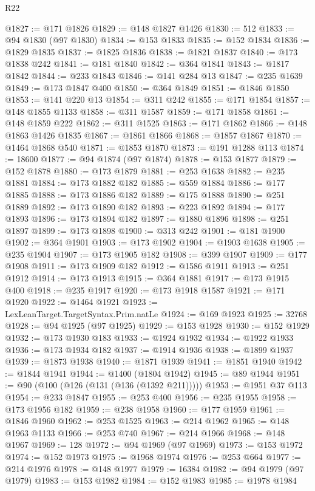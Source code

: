 \begin{lexlean}{R22}
\begin{coremodule}
@1827 := @171 @1826
@1829 := @148 @1827 @1426
@1830 := 512
@1833 := @94 @1830 (@97 @1830)
@1834 := @153 @1833
@1835 := @152 @1834
@1836 := @1829 @1835
@1837 := @1825 @1836
@1838 := @1821 @1837
@1840 := @173 @1838 @242
@1841 := @181 @1840
@1842 := @364 @1841
@1843 := @1817 @1842
@1844 := @233 @1843
@1846 := @141 @284 @13
@1847 := @235 @1639
@1849 := @173 @1847 @400
@1850 := @364 @1849
@1851 := @1846 @1850
@1853 := @141 @220 @13
@1854 := @311 @242
@1855 := @171 @1854
@1857 := @148 @1855 @1133
@1858 := @311 @1587
@1859 := @171 @1858
@1861 := @148 @1859 @222
@1862 := @311 @1525
@1863 := @171 @1862
@1866 := @148 @1863 @1426 @1835
@1867 := @1861 @1866
@1868 := @1857 @1867
@1870 := @1464 @1868 @540
@1871 := @1853 @1870
@1873 := @191 @1288 @113
@1874 := 18600
@1877 := @94 @1874 (@97 @1874)
@1878 := @153 @1877
@1879 := @152 @1878
@1880 := @173 @1879
@1881 := @253 @1638
@1882 := @235 @1881
@1884 := @173 @1882 @182
@1885 := @559 @1884
@1886 := @177 @1885
@1888 := @173 @1886 @182
@1889 := @175 @1888
@1890 := @251 @1889
@1892 := @173 @1890 @182
@1893 := @223 @1892
@1894 := @177 @1893
@1896 := @173 @1894 @182
@1897 := @1880 @1896
@1898 := @251 @1897
@1899 := @173 @1898
@1900 := @313 @242
@1901 := @181 @1900
@1902 := @364 @1901
@1903 := @173 @1902
@1904 := @1903 @1638
@1905 := @235 @1904
@1907 := @173 @1905 @182
@1908 := @399 @1907
@1909 := @177 @1908
@1911 := @173 @1909 @182
@1912 := @1586 @1911
@1913 := @251 @1912
@1914 := @173 @1913
@1915 := @364 @1881
@1917 := @173 @1915 @400
@1918 := @235 @1917
@1920 := @173 @1918 @1587
@1921 := @171 @1920
@1922 := @1464 @1921
@1923 := LexLeanTarget.TargetSyntax.Prim.natLe
@1924 := @169 @1923
@1925 := 32768
@1928 := @94 @1925 (@97 @1925)
@1929 := @153 @1928
@1930 := @152 @1929
@1932 := @173 @1930 @183
@1933 := @1924 @1932
@1934 := @1922 @1933
@1936 := @173 @1934 @182
@1937 := @1914 @1936
@1938 := @1899 @1937
@1939 := @1873 @1938
@1940 := @1871 @1939
@1941 := @1851 @1940
@1942 := @1844 @1941
@1944 := @1400 (@1804 @1942)
@1945 := @89 @1944
@1951 := @90 (@100 (@126 (@131 (@136 (@1392 @211)))))
@1953 := @1951 @37 @113
@1954 := @233 @1847
@1955 := @253 @400
@1956 := @235 @1955
@1958 := @173 @1956 @182
@1959 := @238 @1958
@1960 := @177 @1959
@1961 := @1846 @1960
@1962 := @253 @1525
@1963 := @214 @1962
@1965 := @148 @1963 @1133
@1966 := @253 @740
@1967 := @214 @1966
@1968 := @148 @1967
@1969 := 128
@1972 := @94 @1969 (@97 @1969)
@1973 := @153 @1972
@1974 := @152 @1973
@1975 := @1968 @1974
@1976 := @253 @664
@1977 := @214 @1976
@1978 := @148 @1977
@1979 := 16384
@1982 := @94 @1979 (@97 @1979)
@1983 := @153 @1982
@1984 := @152 @1983
@1985 := @1978 @1984

\end{coremodule}
\end{lexlean}

